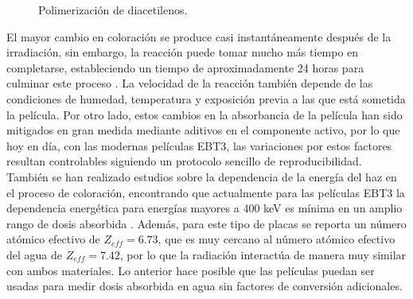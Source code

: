 \begin{figure}[H]
	\centering
	\hfill
	\caption{Polimerización de diacetilenos.}
\end{figure}

El mayor cambio en coloración se produce casi instantáneamente después de la irradiación, sin embargo, la reacción puede tomar mucho más tiempo en completarse, estableciendo un tiempo de aproximadamente 24 horas para culminar este proceso \cite{Williams2011}. La velocidad de la reacción también depende de las condiciones de humedad\cite{LenMarroqun2018}, temperatura \cite{Rink2008} y exposición previa a las que está sometida la película\cite{NiroomandRad1998}. Por otro lado, estos cambios en la absorbancia de la película han sido mitigados en gran medida mediante aditivos en el componente activo, por lo que hoy en día, con las modernas películas EBT3, las variaciones por estos factores resultan controlables siguiendo un protocolo sencillo de reproducibilidad. \\

También se han realizado estudios sobre la dependencia de la energía del haz en el proceso de coloración, encontrando que actualmente para las películas EBT3 la dependencia energética para energías mayores a 400 keV es mínima en un amplio rango de dosis absorbida\cite{Chemiski2010} . Además, para este tipo de placas se reporta un número atómico efectivo de $Z_{eff}=6.73$, que es muy cercano al número atómico efectivo del agua de $Z_{eff}=7.42$, por lo que la radiación interactúa de manera muy similar con ambos materiales. Lo anterior hace posible que las películas puedan ser usadas para medir dosis absorbida en agua sin factores de conversión adicionales.\\

